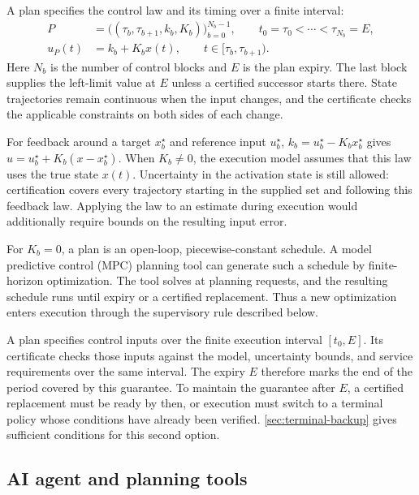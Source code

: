 \documentclass[preprint,12pt]{elsarticle}
\theoremstyle{definition}
\theoremstyle{plain}
\theoremstyle{definition}
\theoremstyle{plain}
\newcommand{\appref}[1]{\ref{#1}}
\begin{document}
A plan specifies the control law and its timing over a finite interval:
\begin{equation}
\begin{aligned}
P&=\bigl((\tau_b,\tau_{b+1},k_b,K_b)\bigr)_{b=0}^{N_b-1},
\qquad t_0=\tau_0<\cdots<\tau_{N_b}=E,\\
u_P(t)&=k_b+K_bx(t),\qquad t\in[\tau_b,\tau_{b+1}).
\end{aligned}
\label{eq:control-plan-tuple}
\end{equation}
Here $N_b$ is the number of control blocks and $E$ is the plan expiry.
The last block supplies the left-limit value at $E$ unless a certified
successor starts there. State trajectories remain continuous when the
input changes, and the certificate checks the applicable constraints on
both sides of each change.

For feedback around a target $x_b^\star$ and reference input $u_b^\star$,
$k_b=u_b^\star-K_bx_b^\star$ gives
$u=u_b^\star+K_b(x-x_b^\star)$. When $K_b\ne0$, the execution model
assumes that this law uses the true state $x(t)$. Uncertainty in the
activation state is still allowed: certification covers every trajectory
starting in the supplied set and following this feedback law. Applying
the law to an estimate during execution would additionally require bounds
on the resulting input error.

For $K_b=0$, a plan is an open-loop, piecewise-constant schedule. A model
predictive control (MPC) planning tool can generate such a schedule by
finite-horizon optimization. The tool solves at planning requests, and
the resulting schedule runs until expiry or a certified replacement.
Thus a new optimization enters execution through the supervisory rule
described below.

A plan specifies control inputs over the finite execution interval
$[t_0,E]$. Its certificate checks those inputs against the model,
uncertainty bounds, and service requirements over the same interval.
The expiry $E$ therefore marks the end of the period covered by this
guarantee. To maintain the guarantee after $E$, a certified replacement
must be ready by then, or execution must switch to a terminal policy
whose conditions have already been verified. \appref{sec:terminal-backup}
gives sufficient conditions for this second option.

\subsection{AI agent and planning tools}
\label{sec:agent-requests}
\end{document}
